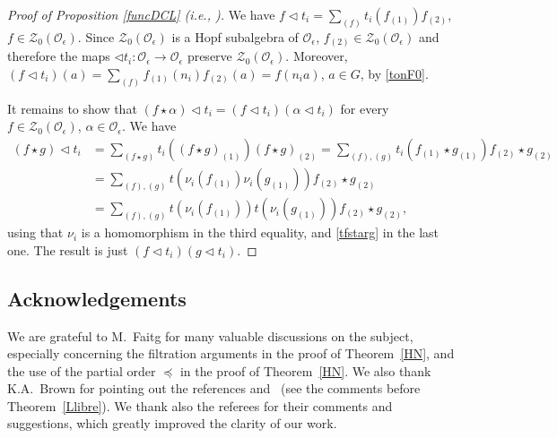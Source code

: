 \documentclass[pdftex]{sigma}
\numberwithin{equation}{section}
\theoremstyle{definition}
\newcommand{\e}{\epsilon}
\newcommand{\Oo}{{\mathcal O}}
\newcommand{\ra}{\rightarrow}
\begin{document}
\begin{proof}[Proof of Proposition \ref{funcDCL} (i.e., {\cite[Proposition 7.1]{DC-L}})] We have $ f\lhd t_i = \sum_{(f)} t_i(f_{(1)})f_{(2)}$, $f\in \mathcal{Z}_0(\Oo_\e)$. Since $\mathcal{Z}_0(\Oo_\e)$ is a Hopf subalgebra of ${\mathcal O}_{\epsilon}$, $f_{(2)} \in \mathcal{Z}_0(\Oo_\e)$ and therefore the maps $\lhd t_i\colon \Oo_\e \ra \Oo_\e$ preserve $\mathcal{Z}_0(\Oo_\e)$. Moreover, $ (f\lhd t_i)(a) = \sum_{(f)} f_{(1)}(n_i)f_{(2)}(a) = f(n_ia)$, $a\in G$, by \eqref{tonF0}.

It remains to show that $(f\star \alpha)\lhd t_i = (f\lhd t_i)(\alpha\lhd t_i)$ for every $f\in \mathcal{Z}_0(\Oo_\e)$, $\alpha\in \mathcal{O}_\e$. We have
\begin{align}
 (f\star g)\lhd t_i &= \sum_{(f\star g)} t_i\left((f\star g)_{(1)}\right)(f\star g)_{(2)}= \sum_{(f),(g)} t_i\left(f_{(1)}\star g_{(1)}\right)f_{(2)}\star g_{(2)}\nonumber\\ & = \sum_{(f),(g)} t\left(\nu_i(f_{(1)})\nu_i(g_{(1)})\right)f_{(2)}\star g_{(2)}\nonumber\\
& =\sum_{(f),(g)} t\left(\nu_i(f_{(1)})\right)t\left(\nu_i(g_{(1)})\right)f_{(2)}\star g_{(2)},\label{fundrelt}
\end{align}
using that $\nu_i$ is a homomorphism in the third equality, and \eqref{tfstarg} in the last one. The result is just $(f\lhd t_i)(g\lhd t_i)$.
\end{proof}

\subsection*{Acknowledgements}We are grateful to M.~Faitg for many valuable discussions on the subject, especially concerning the filtration arguments in the proof of Theorem~\ref{HN}, and the use of the partial order $\preceq$ in the proof of Theorem~\ref{HN}. We also thank K.A.~Brown for pointing out the references \cite{AnGa} and~\cite{BC} (see the comments before Theorem~\ref{Llibre}). We thank also the referees for their comments and suggestions, which greatly improved the clarity of our work.

\end{document}
